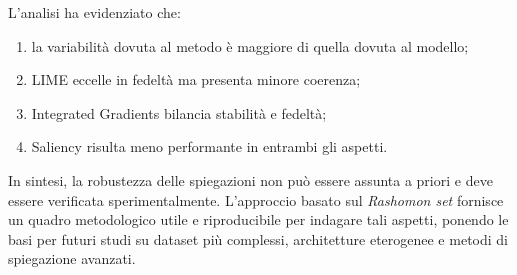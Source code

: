 \documentclass[12pt,a4paper,oneside]{report}
\numberwithin{figure}{chapter}
\numberwithin{table}{chapter}
\begin{document}
L’analisi ha evidenziato che:
\begin{enumerate}
      \item la variabilità dovuta al metodo è maggiore di quella dovuta al modello;
      \item LIME eccelle in fedeltà ma presenta minore coerenza;
      \item Integrated Gradients bilancia stabilità e fedeltà;
      \item Saliency risulta meno performante in entrambi gli aspetti.
\end{enumerate}

In sintesi, la robustezza delle spiegazioni non può essere assunta a priori e
deve essere verificata sperimentalmente. L’approccio basato sul \emph{Rashomon
      set} fornisce un quadro metodologico utile e riproducibile per indagare tali
aspetti, ponendo le basi per futuri studi su dataset più complessi,
architetture eterogenee e metodi di spiegazione avanzati.

\clearpage

\end{document}
